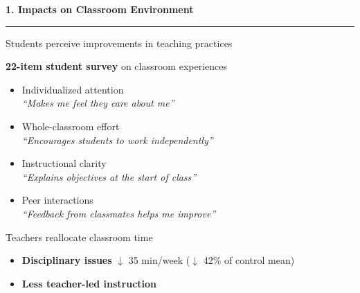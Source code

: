 \documentclass[xcolor=usenames,dvipsnames]{beamer}
\begin{document}
\begin{frame}[plain]
\vspace{2.5cm}
{\large \textbf{1. Impacts on Classroom Environment}}\\
{\color{HopBlue}\rule{0.4\linewidth}{2pt}}
\end{frame}
\begin{frame}{Students perceive improvements in teaching practices}\label{slide:perception}
\scriptsize
\vspace{0.8cm}
\begin{minipage}{0.45\textwidth}
\textbf{22-item student survey} on classroom experiences
\vspace{0.2cm}
\begin{itemize}
  \setlength{\itemsep}{2pt}
  \item Individualized attention\\
    \textit{\color{gray}``Makes me feel they care about me''}
  \item Whole-classroom effort\\
    \textit{\color{gray}``Encourages students to work independently''}
  \item Instructional clarity\\
    \textit{\color{gray}``Explains objectives at the start of class''}
  \item Peer interactions\\
    \textit{\color{gray}``Feedback from classmates helps me improve''}
\end{itemize}
\vspace{1cm}
\hyperlink{perception}{}
\end{minipage}
\end{frame}
\begin{frame}{Teachers reallocate classroom time}

\vspace{0.2cm}
\scriptsize
\begin{itemize}
\item \textbf{Disciplinary issues} $\downarrow$ 35 min/week ($\downarrow$ 42\% of control mean)
\item \textbf{Less teacher-led instruction} 
\end{itemize}
\end{frame}
\end{document}
